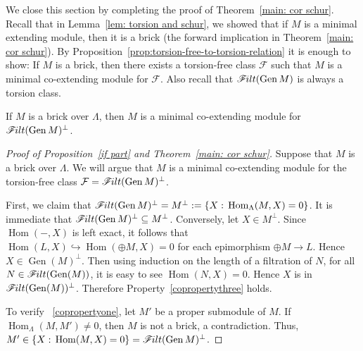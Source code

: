 \documentclass[ALCO,ThmDefs,Unicode,epreuves]{cedram}
\DeclareMathOperator{\Hom}{Hom}
\newcommand{\calF}{\mathcal{F}}
\newcommand{\filt}{\mathscr{F}\Mk ilt}
\newcommand{\Gen}{\operatorname{Gen}}
\renewcommand{\1}{\hat{1}}
\newcommand{\0}{\hat{0}}
\newcommand*{\Mk}{\mkern -2mu}
\begin{document}
We close this section by completing the proof of Theorem~\ref{main: cor schur}.
Recall that in Lemma~\ref{lem: torsion and schur}, we showed that if
$M$ is a minimal extending module, then it is a brick (the forward implication in Theorem~\ref{main: cor schur}).
By Proposition~\ref{prop:torsion-free-to-torsion-relation} it is enough to show:
If $M$ is a brick, then there exists a torsion-free class $\calF$ such that $M$ is a minimal co-extending module for $\calF$. Also recall that $\filt(\Gen M)$ is always a torsion class. 
\begin{proposition}\label{if part}
If $M$ is a brick over $\Lambda$, then $M$ is a minimal co-extending module for $\filt(\Gen M)^{\perp}$.
\end{proposition}
\begin{proof}[Proof of Proposition~\ref{if part} and Theorem~\ref{main: cor schur}]

Suppose that $M$ is a brick over $\Lambda$. We will argue that $M$ is a minimal co-extending module for the torsion-free class $\calF=\filt(\Gen M)^\perp$.

First, we claim that $\filt(\Gen M)^\perp= M^\perp:=\{X:\,\Hom_\Lambda(M, X)=0\}$.
It is immediate that $\filt(\Gen M)^\perp \subseteq M^\perp$. Conversely, let $X\in M^\perp$. Since $\Hom(-,X)$ is left exact, it follows that $\Hom(L,X)\hookrightarrow \Hom(\oplus M,X)=0$ for each epimorphism $\oplus M\rightarrow L$. Hence $ X\in \Gen(M)^\perp $. Then using induction on the length of a filtration of $N$, for all $N\in\filt(\Gen(M))$, it is easy to see $\Hom(N,X)=0$. Hence $X$ is in $\filt(\Gen(M))^\perp$.
Therefore Property~\ref{copropertythree} holds.

To verify ~\ref{copropertyone}, let $M'$ be a proper submodule of
$M$. If $\Hom_\Lambda(M,M')\neq 0$, then $M$ is not a brick, a contradiction. Thus, $M'\in\{X:\,\Hom(M,X)=0\}=\filt(\Gen M)^\perp$. 


\end{proof}
\end{document}
